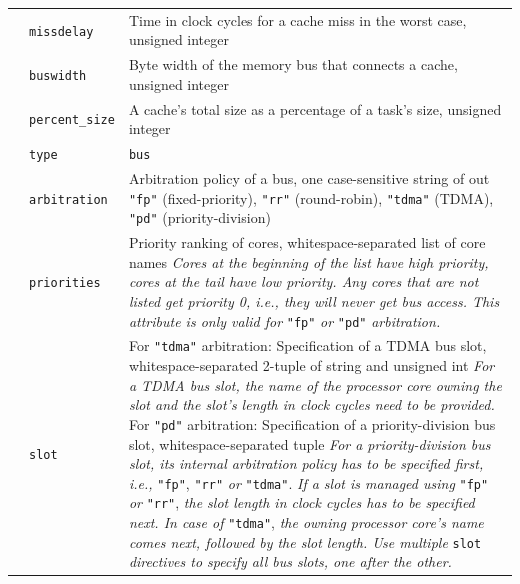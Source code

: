 \begin{table}[t]
\begin{center}
\begin{tabular}{|p{15mm}|p{33mm}|p{11.3cm}|}
      \hhline{|~|-|-|}
      & \small\texttt{missdelay} & Time in clock cycles for a cache miss in the worst case, unsigned integer \\
      \hhline{|~|-|-|}
      & \small\texttt{buswidth} & Byte width of the memory bus that connects a cache, unsigned integer \\
      \hhline{|~|-|-|}
      & \small\texttt{percent\_size} & A cache's total size as a percentage of a task's size, unsigned integer \\
      \hhline{|=|=|=|}
      \multirow{5}{*}{\shortstack[l]{\textbf{Buses}}} & \small\texttt{type} & \small\texttt{bus} \\
      \hhline{|~|-|-|}
      & \small\texttt{arbitration} & Arbitration policy of a bus, one case-sensitive string of out \texttt{"fp"} (fixed-priority), \texttt{"rr"} (round-robin), \texttt{"tdma"} (\gls{TDMA}), \texttt{"pd"} (priority-division) \\
      \hhline{|~|-|-|}
      & \small\texttt{priorities} & Priority ranking of cores, whitespace-separated list of core names \newline \textit{Cores at the beginning of the list have high priority, cores at the tail have low priority. Any cores that are not listed get priority 0, i.e., they will never get bus access. This attribute is only valid for} \texttt{"fp"} \textit{or} \texttt{"pd"} \textit{arbitration.} \\
      \hhline{|~|-|-|}
      & \small\texttt{slot} & For \texttt{\small "tdma"} arbitration: \newline
      Specification of a \gls{TDMA} bus slot, whitespace-separated 2-tuple of string and unsigned int \newline
      \textit{For a \gls{TDMA} bus slot, the name of the processor core owning the slot and the slot's length in clock cycles need to be provided.} \newline
      For \texttt{\small "pd"} arbitration: \newline
      Specification of a priority-division bus slot, whitespace-separated tuple \newline
      \textit{For a priority-division bus slot, its internal arbitration policy has to be specified first, i.e.,} \texttt{\small "fp"}, \texttt{\small "rr"} \textit{or} \texttt{\small "tdma"}. \textit{If a slot is managed using} \texttt{\small "fp"} \textit{or} \texttt{\small "rr"}, \textit{the slot length in clock cycles has to be specified next. In case of} \texttt{\small "tdma"}, \textit{the owning processor core's name comes next, followed by the slot length. \newline Use multiple} \texttt{\small slot} \textit{directives to specify all bus slots, one after the other.} \\

\end{tabular}
\end{center}
\end{table}
